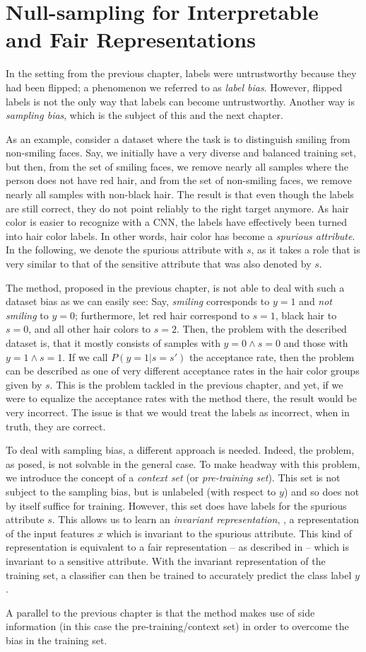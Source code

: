 \chapter{Null-sampling for Interpretable and Fair Representations}\label{ch:nifr}
In the setting from the previous chapter,
labels were untrustworthy because they had been flipped;
a phenomenon we referred to as \emph{label bias}.
However, flipped labels is not the only way that labels can become untrustworthy.
Another way is \emph{sampling bias}, which is the subject of this and the next chapter.

As an example, consider a dataset where the task is to distinguish smiling from non-smiling faces.
Say, we initially have a very diverse and balanced training set,
but then, from the set of smiling faces, we remove nearly all samples where the person does not have red hair,
and from the set of non-smiling faces, we remove nearly all samples with non-black hair.
The result is that even though the labels are still correct, they do not point reliably to the right target anymore.
As hair color is easier to recognize with a \ac{CNN}, the labels have effectively been turned into hair color labels.
In other words, hair color has become a \emph{spurious attribute}.
In the following, we denote the spurious attribute with \(s\),
as it takes a role that is very similar to that of the sensitive attribute that was also denoted by \(s\).

The method, proposed in the previous chapter,
is not able to deal with such a dataset bias as we can easily see:
Say, \emph{smiling} corresponds to \(y=1\) and \emph{not smiling} to \(y=0\);
furthermore, let red hair correspond to \(s=1\), black hair to \(s=0\), and all other hair colors to \(s=2\).
Then, the problem with the described dataset is, that it mostly consists of samples with \(y=0\wedge s=0\)
and those with \(y=1\wedge s=1\).
If we call \(P(y=1|s=s')\) the acceptance rate,
then the problem can be described as one of very different acceptance rates in the hair color groups given by \(s\).
This is the problem tackled in the previous chapter,
and yet, if we were to equalize the acceptance rates with the method there,
the result would be very incorrect.
The issue is that we would treat the labels as incorrect, when in truth, they are correct.

To deal with sampling bias, a different approach is needed.
Indeed, the problem, as posed, is not solvable in the general case.
To make headway with this problem, we introduce the concept of a \emph{context set} (or \emph{pre-training set}).
This set is not subject to the sampling bias,
but is unlabeled (with respect to $y$) and so does not by itself suffice for training.
However, this set does have labels for the spurious attribute \(s\).
This allows us to learn an \emph{invariant representation},
\ie, a representation of the input features \(x\) which is invariant to the spurious attribute.
This kind of representation is equivalent to a fair representation -- as described in  --
which is invariant to a sensitive attribute.
With the invariant representation of the training set,
a classifier can then be trained to accurately predict the class label \(y\).

A parallel to the previous chapter is that the method makes use of side information
(in this case the pre-training/context set)
in order to overcome the bias in the training set.
